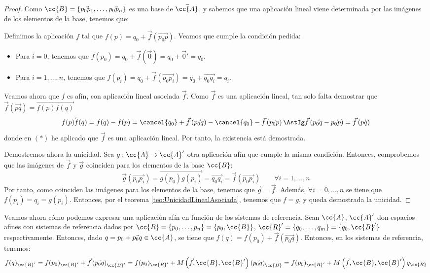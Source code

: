\begin{proof}
    Como $\cc{B}=\{\vec{p_0p_1},\dots,\vec{p_0p_n}\}$ es una base de $\vec{\cc{A}}$, y sabemos que una aplicación lineal viene determinada por las imágenes de los elementos de la base, tenemos que:

    Definimos la aplicación $f$ tal que $f(p)=q_0+\vec{f}\left(\vec{p_0p}\right)$. Veamos que cumple la condición pedida:
    \begin{itemize}
        \item Para $i=0$, tenemos que $f(p_0)=q_0+\vec{f}(\vec{0}) = q_0+\vec{0}'=q_0$.
        \item Para $i=1,\dots,n$, tenemos que $f(p_i)=q_0+\vec{f}(\vec{p_0p_i}) = q_0+\vec{q_0q_i} = q_i$.
    \end{itemize}

    Veamos ahora que $f$ es afín, con aplicación lineal asociada $\vec{f}$. Como $\vec{f}$ es una aplicación lineal, tan solo falta demostrar que $\vec{f}(\vec{pq}) = \vec{f(p)f(q)}$
    \begin{equation*}
        \vec{f(p)f(q)} = f(q)-f(p) = \cancel{q_0}+\vec{f}\left(\vec{p_0q}\right)-\cancel{q_0}-\vec{f}\left(\vec{p_0p}\right) \AstIg \vec{f}\left(\vec{p_0q} -\vec{p_0p}\right) =\vec{f}\left(\vec{pq}\right)
    \end{equation*}
    donde en $(\ast)$ he aplicado que $\vec{f}$ es una aplicación lineal. Por tanto, la existencia está demostrada.

    Demostremos ahora la unicidad. Sea $g:\cc{A}\to \cc{A}'$ otra aplicación afín que cumple la misma condición. Entonces, comprobemos que las imágenes de $\vec{f}$ y $\vec{g}$ coinciden para los elementos de la base $\cc{B}$:
    \begin{equation*}
        \vec{g}\left(\vec{p_0p_i}\right) = \vec{g(p_0)g(p_i)} = \vec{q_0q_i} = \vec{f}\left(\vec{p_0p_i}\right) \qquad \forall i=1,\dots,n
    \end{equation*}
    Por tanto, como coinciden las imágenes para los elementos de la base, tenemos que $\vec{g}=\vec{f}$. Además, $\forall i=0,\dots,n$ se tiene que $f(p_i)=q_i=g(p_i)$. Entonces, por el teorema \ref{teo:UnicidadLinealAsociada}, tenemos que $f=g$, y queda demostrada la unicidad.
\end{proof}\vspace{1cm}

Veamos ahora cómo podemos expresar una aplicación afín en función de los sistemas de referencia. Sean $\cc{A}$, $\cc{A}'$ don espacios afines con sistemas de referencia dados por $\cc{R}=\{p_0,\dots,p_n\}=\{p_0,\cc{B}\}$, $\cc{R}'=\{q_0,\dots,q_m\}=\{q_0,\cc{B}'\}$ respectivamente. Entonces, dado $q=p_0+\vec{p_0q}\in \cc{A}$, se tiene que $f(q)=f(p_0)+\vec{f}(\vec{p_0q})$. Entonces, en los sistemas de referencia, tenemos:
\begin{equation*}
    f(q)_{\cc{R}'} = f(p_0)_{\cc{R}'} + \vec{f}\left(\vec{p_0q}\right)_{\cc{B}'}
    = f(p_0)_{\cc{R}'} + M\left(\vec{f},\cc{B},\cc{B}'\right)\left(\vec{p_0q}\right)_{\cc{B}}
    = f(p_0)_{\cc{R}'} + M\left(\vec{f},\cc{B},\cc{B}'\right)q_{\cc{R}}
\end{equation*}

